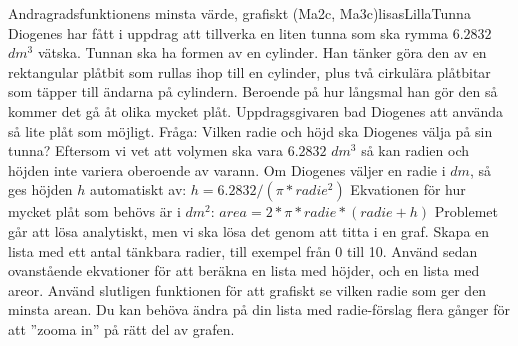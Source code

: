 \begin{matteovningm}{Andragradsfunktionens minsta värde, grafiskt (Ma2c, Ma3c)}{lisasLillaTunna}
	Diogenes har fått i uppdrag att tillverka en liten tunna som ska rymma $6.2832$ $dm^3$ vätska. Tunnan ska ha formen av en cylinder. Han tänker göra den av en rektangular plåtbit som rullas ihop till en cylinder, plus två cirkulära plåtbitar som täpper till ändarna på cylindern. Beroende på hur långsmal han gör den så kommer det gå åt olika mycket plåt. Uppdragsgivaren bad Diogenes att använda så lite plåt som möjligt.
\newline
\newline
Fråga: Vilken radie och höjd ska Diogenes välja på sin tunna?
\newline
\newline
Eftersom vi vet att volymen ska vara $6.2832$ $dm^3$ så kan radien och höjden inte variera oberoende av varann. Om Diogenes väljer en radie i $dm$, så ges höjden $h$ automatiskt av:
\newline
\newline
$h = 6.2832 / (\pi * radie^2)$
\newline
\newline
Ekvationen för hur mycket plåt som behövs är i $dm^2$:
\newline
\newline
$area = 2 * \pi * radie * (radie + h)$
\newline
\newline
Problemet går att lösa analytiskt, men vi ska lösa det genom att titta i en graf. Skapa en lista med ett antal tänkbara radier, till exempel från 0 till 10. Använd sedan ovanstående ekvationer för att beräkna en lista med höjder, och en lista med areor. Använd slutligen funktionen  för att grafiskt se vilken radie som ger den minsta arean. Du kan behöva ändra på din lista med radie-förslag flera gånger för att ''zooma in'' på rätt del av grafen.
\end{matteovningm}



\newpage
